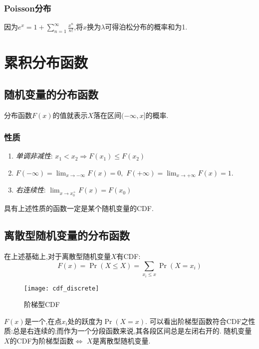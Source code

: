 \subsubsection{Poisson分布}
因为$e^x=1+\sum_{n=1}^{\infty}\frac{x^n}{n!}$,将$x$换为$\lambda$可得泊松分布的概率和为1.
\section{累积分布函数}
\subsection{随机变量的分布函数}
分布函数$F(x)$的值就表示$X$落在区间$(-\infty,x]$的概率.
\subsubsection{性质}
\begin{enumerate}
    \item \textit{单调非减性}: $x_1<x_2\Rightarrow F(x_1)\leq F(x_2)$
    \item $F(-\infty) = \lim_{x\rightarrow -\infty}F(x) = 0,\,\,F(+\infty) = \lim_{x\rightarrow +\infty}F(x) = 1$.
    \item \textit{右连续性}: $\lim_{x\rightarrow x_0^+}F(x) = F(x_0)$
\end{enumerate}
具有上述性质的函数一定是某个随机变量的CDF.
\newpage
\subsection{离散型随机变量的分布函数}
在上述基础上,对于离散型随机变量$X$有CDF:
\[F(x) = \Pr(X\leq X) = \sum_{x_i\leq x}\Pr(X=x_i)\]

\begin{figure}[h]
    \centering
    \texttt{[image: cdf\_discrete]}
    \caption{阶梯型CDF}
\end{figure}
$F(x)$是一个,在点$x_i$处的跃度为$\Pr(X=x)$.
可以看出阶梯型函数符合CDF之性质:总是右连续的;而作为一个分段函数来说,其各段区间总是左闭右开的.
随机变量$X$的CDF为阶梯型函数$\Leftrightarrow$ $X$是离散型随机变量.
